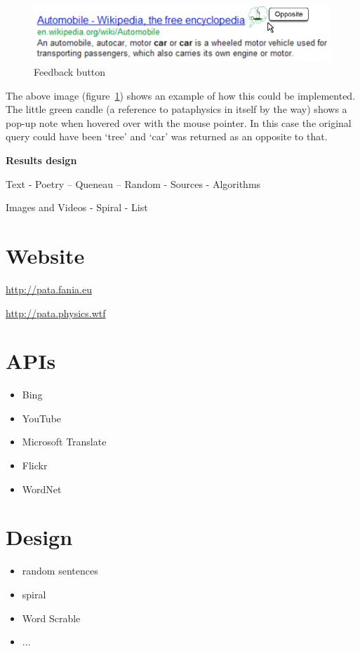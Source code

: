 \begin{figure}[htb] %
  \centering
  \includegraphics[width=\linewidth]{images/resultexample}
\caption[Feedback button]{Feedback button}
\label{fig:feedback}
\end{figure}

The above image (figure~\ref{fig:feedback}) shows an example of how this could be implemented. The little green candle (a reference to pataphysics in itself by the way) shows a pop-up note when hovered over with the mouse pointer. In this case the original query could have been `tree' and `car' was returned as an opposite to that.

\textbf{Results design}

Text
- Poetry
-- Queneau
-- Random
- Sources
- Algorithms

Images and Videos
- Spiral
- List




\section{Website}

\url{http://pata.fania.eu}

\url{http://pata.physics.wtf}


\section{APIs}

\begin{itemize}
  \item Bing
  \item YouTube
  \item Microsoft Translate
  \item Flickr
  \item WordNet
\end{itemize}


\section{Design}

\begin{itemize}
  \item random sentences
  \item spiral
  \item Word Scrable
  \item $\dots$
\end{itemize}


